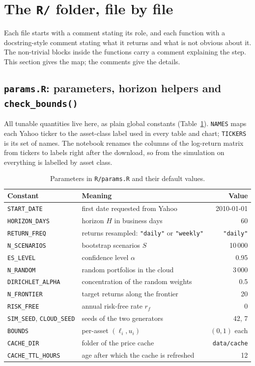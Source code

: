\documentclass[11pt,a4paper]{article}
\newcommand{\code}[1]{\texttt{#1}}
\newcommand{\file}[1]{\texttt{#1}}
\theoremstyle{plain}
\theoremstyle{remark}
\begin{document}
\section{The \file{R/} folder, file by file}
\label{sec:code-r}

Each file starts with a comment stating its role, and each function with a
docstring-style comment stating what it returns and what is not obvious
about it. The non-trivial blocks inside the functions carry a comment
explaining the step. This section gives the map; the comments give the
details.

\subsection{\file{params.R}: parameters, horizon helpers and \code{check\_bounds()}}

All tunable quantities live here, as plain global constants
(Table~\ref{tab:params}). \code{NAMES} maps each Yahoo ticker to the
asset-class label used in every table and chart; \code{TICKERS} is its set
of names. The notebook renames the columns of the log-return matrix from
tickers to labels right after the download, so from the simulation on
everything is labelled by asset class.

\begin{table}[htbp]
\centering
\begin{tabular}{llr}
\toprule
Constant & Meaning & Value \\
\midrule
\code{START\_DATE}      & first date requested from Yahoo        & 2010-01-01 \\
\code{HORIZON\_DAYS}    & horizon $H$ in business days            & 60 \\
\code{RETURN\_FREQ}     & returns resampled: \code{"daily"} or \code{"weekly"} & \code{"daily"} \\
\code{N\_SCENARIOS}     & bootstrap scenarios $S$                 & 10\,000 \\
\code{ES\_LEVEL}        & confidence level $\alpha$               & 0.95 \\
\code{N\_RANDOM}        & random portfolios in the cloud          & 3\,000 \\
\code{DIRICHLET\_ALPHA} & concentration of the random weights     & 0.5 \\
\code{N\_FRONTIER}      & target returns along the frontier       & 20 \\
\code{RISK\_FREE}       & annual risk-free rate $r_f$             & 0 \\
\code{SIM\_SEED}, \code{CLOUD\_SEED} & seeds of the two generators & 42, 7 \\
\code{BOUNDS}           & per-asset $(\ell_i, u_i)$               & $(0,1)$ each \\
\code{CACHE\_DIR}       & folder of the price cache               & \file{data/cache} \\
\code{CACHE\_TTL\_HOURS} & age after which the cache is refreshed & 12 \\
\bottomrule
\end{tabular}
\caption{Parameters in \file{R/params.R} and their default values.}
\label{tab:params}
\end{table}
\end{document}
